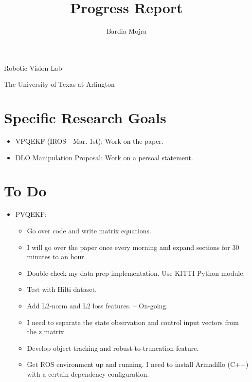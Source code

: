 \documentclass[11pt]{article}
\title{Progress Report}
\author{Bardia Mojra}
\begin{document}
\maketitle
\thispagestyle{empty}

\bigskip
\bigskip
\begin{center}
      Robotic Vision Lab
\end{center}

\begin{center}
      The University of Texas at Arlington
\end{center}

\newpage

\section{Specific Research Goals}
\begin{itemize}
      \item VPQEKF (IROS - Mar. 1st): Work on the paper.
      \item DLO Manipulation Proposal: Work on a persoal statement.
\end{itemize}

\section{To Do}
\begin{itemize}
  \item PVQEKF:
  \begin{itemize}
      \item Go over code and write matrix equations.
      \item I will go over the paper once every morning and expand sections for 30 minutes to an hour.
      \item Double-check my data prep implementation. Use KITTI Python module.
      \item Test with Hilti dataset.
      \item Add L2-norm and L2 loss features. -- On-going.
      \item I need to separate the state observation and control input vectors from the z matrix.
      \item Develop object tracking and robust-to-truncation feature.
      \item Get ROS environment up and running. I need to install Armadillo (C++) with a certain dependency configuration.
  \end{itemize}
\end{itemize}
\end{document}
